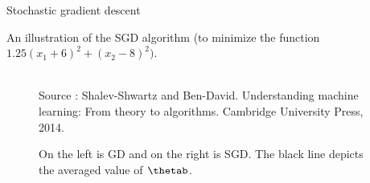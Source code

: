 \begin{vbframe}{Stochastic gradient descent}
  \framebreak

 
 An illustration of the SGD algorithm (to minimize the function $1.25(x_1 + 6)^2 + (x_2 - 8)^2)$.
 \begin{figure}
    \tiny{\\ Source : Shalev-Shwartz and  Ben-David.
Understanding machine learning: From theory to algorithms. Cambridge University Press, 2014. }
 \caption{On the left is GD and on the right is SGD. The black line depicts the averaged value of $\thetab$.}
 \end{figure}

  \end{vbframe}
  

